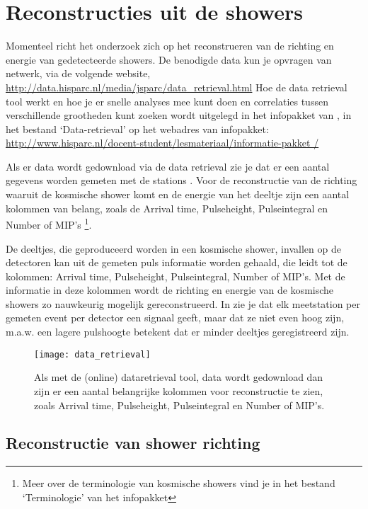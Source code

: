 \section{Reconstructies uit de showers}

Momenteel richt het \hisparc onderzoek zich op het reconstrueren
van de richting  en energie van gedetecteerde showers. De benodigde data kun je opvragen
van \hisparc netwerk, via de volgende website,
\url{http://data.hisparc.nl/media/jsparc/data_retrieval.html} Hoe de
data retrieval tool werkt en hoe je er snelle analyses mee kunt doen en
correlaties tussen verschillende grootheden kunt zoeken wordt uitgelegd
in het infopakket van \hisparc, in het bestand `Data-retrieval' op het
webadres van infopakket:
\url{http://www.hisparc.nl/docent-student/lesmateriaal/informatie-pakket
/}

Als er data wordt gedownload via de data retrieval zie je dat er een aantal 
gegevens worden gemeten met de stations . Voor de 
reconstructie van de richting waaruit de kosmische shower komt en de energie 
van het deeltje zijn een aantal kolommen van belang, zoals de Arrival time,
Pulseheight, Pulseintegral en Number of MIP's \footnote{Meer over de terminologie 
van kosmische showers vind je in het bestand `Terminologie' van het infopakket}.

De deeltjes, die geproduceerd worden in een kosmische shower, invallen op de 
detectoren kan uit de gemeten puls informatie worden gehaald, die leidt tot de 
kolommen: Arrival time, Pulseheight, Pulseintegral, Number of MIP's.
Met de informatie in deze kolommen wordt de richting en energie van de kosmische
showers zo nauwkeurig mogelijk gereconstrueerd. In  zie je 
dat elk meetstation per gemeten event per detector een signaal geeft, maar 
dat ze niet even hoog zijn, m.a.w. een lagere pulshoogte betekent dat er 
minder deeltjes geregistreerd 
zijn.
 

\begin{figure}
    \centering
    \texttt{[image: data\_retrieval]}
    \caption{Als met de (online) dataretrieval tool, data wordt gedownload dan zijn 
    er een aantal belangrijke kolommen voor reconstructie te zien, zoals Arrival time, 
    Pulseheight, Pulseintegral en Number of MIP's.}
    \label{fig:data_retrieval}
\end{figure}

\subsection{Reconstructie van shower richting}

